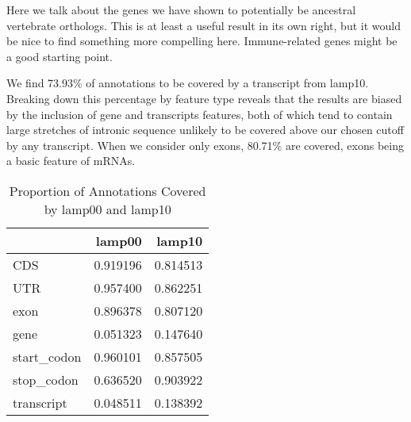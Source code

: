 \documentclass{article}
\begin{document}
Here we talk about the genes we have shown to potentially be ancestral vertebrate orthologs. This is at least a useful result in its own right, but it would be
nice to find something more compelling here. Immune-related genes might be a good starting point.





We find 73.93\%
 of annotations to be covered by a transcript from lamp10. 
Breaking down this percentage by feature type reveals that the results are biased by the inclusion of gene and transcripts features, 
both of which tend to contain large stretches of intronic sequence unlikely to be covered above our chosen cutoff by any transcript. 
When we consider only exons, 80.71\%
 are covered, exons
being a basic feature of mRNAs.

\begin{table}[H]
\caption {Proportion of Annotations Covered by lamp00 and lamp10}
\begin{center}

\begin{tabular}{lrr}
\toprule
{} &    lamp00 &    lamp10 \\
\midrule
CDS         &  0.919196 &  0.814513 \\
UTR         &  0.957400 &  0.862251 \\
exon        &  0.896378 &  0.807120 \\
gene        &  0.051323 &  0.147640 \\
start\_codon &  0.960101 &  0.857505 \\
stop\_codon  &  0.636520 &  0.903922 \\
transcript  &  0.048511 &  0.138392 \\
\bottomrule
\end{tabular}



\end{center}
\end{table}
\end{document}
